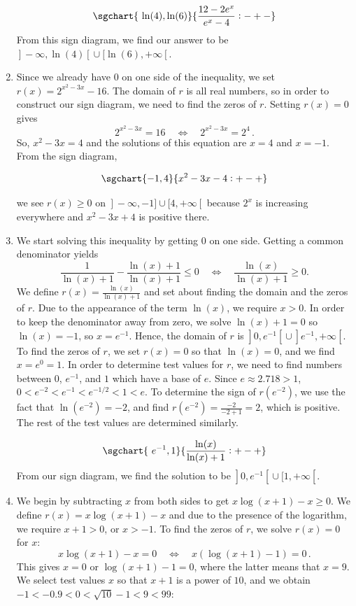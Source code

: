 \begin{example}
\begin{enumerate}
$$
\sgchart{~\ln(4) ,  \ln(6)} {\dfrac{12 - 2e^{x}}{e^{x}-4}: -+-}
$$
 From this sign diagram, we find our answer to be $\left.\right]-\infty,\ln(4)\left[\right. \cup [\ln(6), +\infty\left[\right.$. 

\item  Since we already have $0$ on one side of the inequality, we set $r(x) = 2^{x^2-3x} - 16$.  The domain of $r$ is all real numbers, so in order to construct our sign diagram, we need to find the zeros of $r$.  Setting $r(x) = 0$ gives 
$$2^{x^2-3x} = 16\quad \Leftrightarrow\quad 2^{x^2-3x} = 2^{4}\,.$$
So, $x^2 -3x = 4$ and the solutions of this equation are $x=4$ and $x=-1$.  From the sign diagram, 

$$\sgchart{-1, 4} {x^2-3x-4: +-+}$$


we see $r(x) \geq 0$ on $\left.\right]-\infty, -1] \cup [4, +\infty\left[\right.$ because $2^x$ is increasing everywhere and $x^2-3x+4$ is positive there.



\item  We start solving this inequality by getting $0$ on one side.   Getting a common denominator yields 
$$\dfrac{1}{\ln(x)+1}  - \dfrac{\ln(x)+1}{\ln(x)+1} \leq 0\quad\Leftrightarrow\quad  \frac{\ln(x)}{\ln(x)+1} \geq 0.$$  We define $r(x) = \frac{\ln(x)}{\ln(x)+1}$ and set about finding the domain and the zeros of $r$.  Due to the appearance of the term $\ln(x)$, we require  $x > 0$.  In order to keep the denominator away from zero, we solve $\ln(x)+1 = 0$ so $\ln(x) = -1$, so $x = e^{-1}$.  Hence, the domain of $r$ is $\left.\right]0, e^{-1}\left[\right. \cup \left.\right]e^{-1}, +\infty\left[\right.$.  To find the zeros of $r$, we set $r(x) = 0$ so that $\ln(x) = 0$, and we find $x = e^{0} = 1$.  In order to determine test values for $r$, we need to find numbers between $0$, $e^{-1}$, and $1$ which have a base of $e$.  Since $e \approx 2.718 > 1$, $0 < e^{-2} < e^{-1} < e^{-1/2} < 1 < e$.  To determine the sign of $r\left( e^{-2} \right)$, we use the fact that $\ln\left(e^{-2}\right)  = -2$, and find $r\left( e^{-2}\right) = \frac{-2}{-2+1} = 2$, which is positive.  The rest of the test values are determined similarly. 

$$
\sgchart{~e^{-1}, 1} {\dfrac{\ln(x)}{\ln(x)+1}: +-+}
$$
  From our sign diagram, we find the solution to be $\left.\right]0, e^{-1}\left[\right. \cup [1, +\infty\left[\right.$. 

\item  We begin by subtracting $x$ from both sides to get $x \log(x+1)  - x \geq 0$.  We define $r(x) = x \log(x+1)  - x $ and due to the presence of the logarithm, we require $x+1 > 0$, or $x > -1$.  To find the zeros of $r$, we solve $r(x)=0$ for $x$:
$$
x \log(x+1)  - x = 0\quad\Leftrightarrow\quad x \left(\log(x+1) - 1\right) = 0\,.$$
 This gives $x=0$ or $\log(x+1) - 1=0$, where the latter means that  $x = 9$.  We select test values $x$ so that $x+1$ is a power of $10$, and we obtain $-1 < -0.9 < 0 < \sqrt{10} -1 < 9 < 99$:


\end{enumerate}
\end{example}
